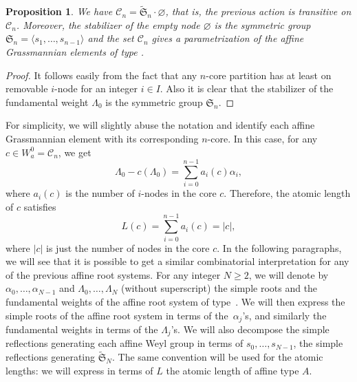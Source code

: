 \documentclass[10pt,a4paper]{amsart}
\newtheorem{Proposition}[Theorem]{Proposition}
 { \theoremstyle{definition}
\newtheorem{Definition}[Theorem]{Definition}
\newtheorem{Note}[Theorem]{Note}
\newtheorem{Example}[Theorem]{Example}
\newtheorem{Remark}[Theorem]{Remark} }
\numberwithin{equation}{section}
\begin{document}
\begin{Proposition}
We have $\mathcal{C}_{n}=\widetilde{\mathfrak{S}}_{n}\cdot \varnothing $, that is, the previous action is transitive on $\mathcal{C}_{n}$. Moreover, the
stabilizer of the empty node $\varnothing $ is the symmetric group $\mathfrak{S%
}_{n}=\langle s_{1},\dots ,s_{n-1}\rangle $ and the set $\mathcal{C}_{n}$
gives a parametrization of the affine Grassmannian elements of type .
\end{Proposition}

\begin{proof}
	It follows easily from the fact that any $n$-core partition has at least on removable $i$-node for an integer $i \in I$.
	Also it is clear that the stabilizer of the fundamental weight $\Lambda_0$ is the symmetric group $\mathfrak{S}_{n}$.
\end{proof}

For simplicity, we will slightly abuse the notation and identify each affine
Grassmannian element with its corresponding $n$-core. In this case, for
any $c\in W_{a}^{0}=\mathcal{C}_{n}$, we get
\begin{equation}
\Lambda _{0}-c(\Lambda _{0})=\sum_{i=0}^{n-1}a_{i}(c)\alpha _{i},
\label{DelaAffineA}
\end{equation}
where $a_{i}(c)$ is the number of $i$-nodes in the core $c$. Therefore, the
atomic length of $c$ satisfies
\begin{equation*}
L(c)=\sum_{i=0}^{n-1}a_{i}(c)=\vert c \vert,
\end{equation*}%
where $\vert c \vert $ is just the number of nodes in the core $c$. In the following paragraphs, we will see that it is possible to get a
similar combinatorial interpretation for any of the previous affine root
systems. For any integer $N\geq 2$, we will denote by $\alpha _{0},\dots,\alpha _{N-1}$ and $\Lambda _{0},\dots ,\Lambda _{N}$ (without
superscript) the simple roots and the fundamental weights of the affine root
system of type~. We will then express the simple roots
 of the affine root system  in terms
of the~$\alpha _{j}$'s, and similarly the fundamental weights  in terms of the $\Lambda _{j}$'s. We will also decompose
the simple reflections generating each affine Weyl group 
in terms of $s_{0},\dots ,s_{N-1}$, the simple reflections generating $%
\widetilde{\mathfrak{S}}_{N}$. The same convention will be used for the
atomic lengths: we will express  in terms of $L$ the atomic
length of affine type $A$.
\end{document}
